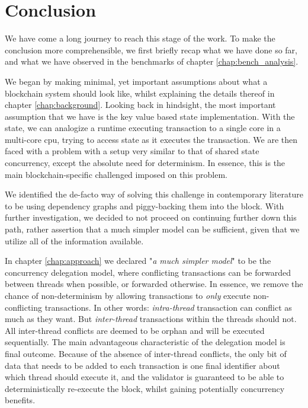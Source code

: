 \chapter{Conclusion} \label{chap:conclusion}

We have come a long journey to reach this stage of the work. To make the conclusion more
comprehensible, we first briefly recap what we have done so far, and what we have observed in
the benchmarks of chapter \ref{chap:bench_analysis}.

We began by making minimal, yet important assumptions about what a blockchain system should look
like, whilst explaining the details thereof in chapter \ref{chap:background}. Looking back in
hindsight, the most important assumption that we have is the key value based state implementation.
With the state, we can analogize a runtime executing transaction to a single core in a multi-core
cpu, trying to access state as it executes the transaction. We are then faced with a problem with a
setup very similar to that of shared state concurrency, except the absolute need for determinism. In
essence, this is the main blockchain-specific challenged imposed on this problem.

We identified the de-facto way of solving this challenge in contemporary literature to be using
dependency graphs and piggy-backing them into the block. With further investigation, we decided to
not proceed on continuing further down this path, rather assertion that a much simpler model can be
sufficient, given that we utilize all of the information available.

In chapter \ref{chap:approach} we declared "\textit{a much simpler model}" to be the concurrency
delegation model, where conflicting transactions can be forwarded between threads when possible, or
forwarded otherwise. In essence, we remove the chance of non-determinism by allowing transactions to
\textit{only} execute non-conflicting transactions. In other words: \textit{intra-thread}
transaction can conflict as much as they want. But \textit{inter-thread} transactions within the
threads should not. All inter-thread conflicts are deemed to be orphan and will be executed
sequentially. The main advantageous characteristic of the delegation model is final outcome. Because
of the absence of inter-thread conflicts, the only bit of data that needs to be added to each
transaction is one final identifier about which thread should execute it, and the validator is
guaranteed to be able to deterministically re-execute the block, whilst gaining potentially
concurrency benefits.

